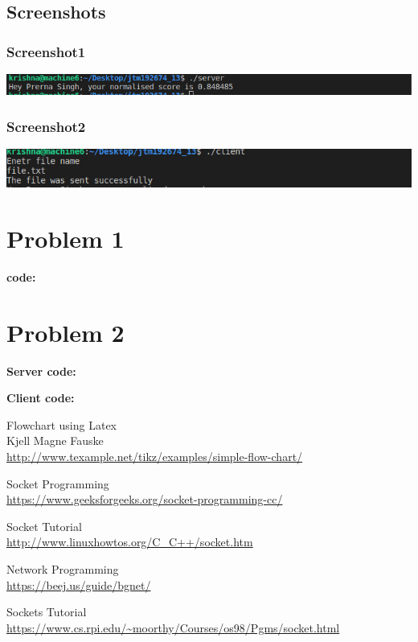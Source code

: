 \documentclass[12pt]{article}
\begin{document}
\subsection{Screenshots}
\subsubsection{Screenshot1}
\includegraphics[width=\linewidth]{lab13_a.png}
\subsubsection{Screenshot2}
\includegraphics[width=\linewidth]{lab13_b.png}
\clearpage
\newpage
 \appendix
   \appendixpage
   \addappheadtotoc
  \section*{Problem 1}
  {\large \textbf{code:}}
  
  \section*{Problem 2}
  {\large \textbf{Server code:}}
  
  {\large \textbf{Client code:}}
  
  
\newpage
\begin{thebibliography}{11}
Flowchart using Latex\\
Kjell Magne Fauske \\
\url{http://www.texample.net/tikz/examples/simple-flow-chart/}

Socket Programming \\
\url{https://www.geeksforgeeks.org/socket-programming-cc/}

Socket Tutorial\\
\url{http://www.linuxhowtos.org/C_C++/socket.htm}

Network Programming\\
\url{https://beej.us/guide/bgnet/}

Sockets Tutorial\\
\url{https://www.cs.rpi.edu/~moorthy/Courses/os98/Pgms/socket.html}

\end{thebibliography}

   
   
\end{document}
